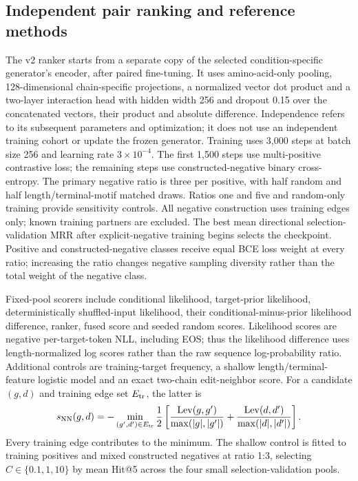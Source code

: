 \documentclass[10pt]{article}
\begin{document}
\subsection{Independent pair ranking and reference methods}
The v2 ranker starts from a separate copy of the selected condition-specific
generator's encoder, after paired fine-tuning. It uses amino-acid-only pooling,
128-dimensional chain-specific projections, a normalized vector dot product
and a two-layer interaction head with hidden width 256 and dropout 0.15 over
the concatenated vectors, their product and absolute difference. Independence
refers to its subsequent parameters and optimization; it does not use an
independent training cohort or update the frozen generator. Training uses 3,000 steps
at batch size 256 and learning rate $3\times10^{-4}$. The first 1,500 steps use
multi-positive contrastive loss; the remaining steps use constructed-negative
binary cross-entropy. The primary negative ratio is three per positive, with
half random and half length/terminal-motif matched draws. Ratios one and five
and random-only training provide sensitivity controls. All negative construction
uses training edges only; known training partners are excluded. The best mean
directional selection-validation MRR after explicit-negative training begins
selects the checkpoint.
Positive and constructed-negative classes receive equal BCE loss weight at
every ratio; increasing the ratio changes negative sampling diversity rather
than the total weight of the negative class.

Fixed-pool scorers include conditional likelihood, target-prior likelihood,
deterministically shuffled-input likelihood, their conditional-minus-prior
likelihood difference, ranker, fused score and seeded random scores.
Likelihood scores are negative per-target-token NLL, including EOS; thus the
likelihood difference uses length-normalized log scores rather than the raw
sequence log-probability ratio. Additional
controls are training-target frequency, a shallow length/terminal-feature
logistic model and an exact two-chain edit-neighbor score. For a candidate
$(g,d)$ and training edge set $E_{\rm tr}$, the latter is
\begin{equation}
s_{\rm NN}(g,d)=-\min_{(g',d')\in E_{\rm tr}}
\frac{1}{2}\left[
\frac{\operatorname{Lev}(g,g')}{\max(|g|,|g'|)}+
\frac{\operatorname{Lev}(d,d')}{\max(|d|,|d'|)}\right].
\end{equation}
Every training edge contributes to the minimum. The shallow control is fitted
to training positives and mixed constructed negatives at ratio 1:3, selecting
$C\in\{0.1,1,10\}$ by mean Hit@5 across the four small selection-validation pools.
\end{document}
